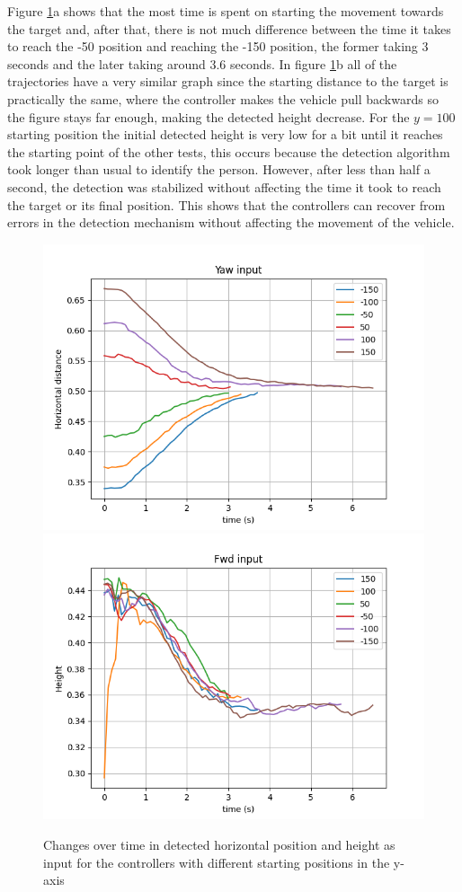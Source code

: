 Figure \ref{fig:validate-yaw}a shows that the most time is spent on starting the movement towards the target and, after that, there is not much difference between the time it takes to reach the -50 position and reaching the -150 position, the former taking 3 seconds and the later taking around 3.6 seconds.
In figure \ref{fig:validate-yaw}b all of the trajectories have a very similar graph since the starting distance to the target is practically the same, where the controller makes the vehicle pull backwards so the figure stays far enough, making the detected height decrease.
For the $y=100$ starting position the initial detected height is very low for a bit until it reaches the starting point of the other tests, this occurs because the detection algorithm took longer than usual to identify the person.
However, after less than half a second, the detection was stabilized without affecting the time it took to reach the target or its final position.
This shows that the controllers can recover from errors in the detection mechanism without affecting the movement of the vehicle.


\begin{figure}
  \centering
  \includegraphics[width=.45\linewidth]{img/pid/validation_yaw.png}
  \includegraphics[width=.45\linewidth]{img/pid/validation_yaw_2.png}
  \caption{Changes over time in detected horizontal position and height as input for the controllers with different starting positions in the y-axis}
  \label{fig:validate-yaw}
\end{figure}

